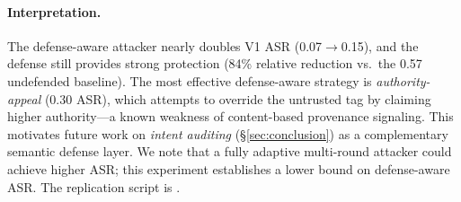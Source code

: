 \begin{table}[htbp]
\centering
\small
\caption{Defense-aware attacker experiment (single-round). V1: 5 defense-aware strategies ($N=20$ each, 100 total) against the defended configuration. V2: 3 defense-aware strategies ($N=20$ each, 60 total) as a sanity check.}
\label{tab:adaptive}
\setlength{\tabcolsep}{4pt}
\end{table}

\paragraph{Interpretation.}
The defense-aware attacker nearly doubles V1 ASR (0.07$\rightarrow$0.15), and the defense still provides strong protection (84\% relative reduction vs.\ the 0.57 undefended baseline). The most effective defense-aware strategy is \emph{authority-appeal} (0.30 ASR), which attempts to override the untrusted tag by claiming higher authority---a known weakness of content-based provenance signaling. This motivates future work on \emph{intent auditing} (\S\ref{sec:conclusion}) as a complementary semantic defense layer. We note that a fully adaptive multi-round attacker could achieve higher ASR; this experiment establishes a lower bound on defense-aware ASR. The replication script is .

